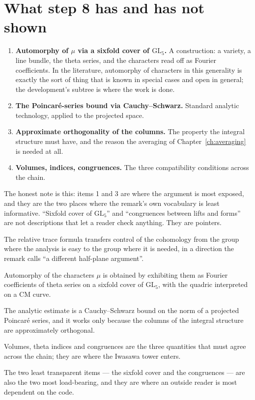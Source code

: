 \section{What step 8 has and has not shown}\begin{enumerate}
\item \textbf{Automorphy of $\mu$ via a sixfold cover of $\mathrm{GL}_5$.} A
construction: a variety, a line bundle, the theta series, and the characters
read off as Fourier coefficients. In the literature, automorphy of characters
in this generality is exactly the sort of thing that is known in special cases
and open in general; the development's  subtree is
where the work is done.
\item \textbf{The Poincar\'e-series bound via Cauchy--Schwarz.} Standard
analytic technology, applied to the projected space.
\item \textbf{Approximate orthogonality of the columns.} The property the
integral structure must have, and the reason the averaging of
Chapter~\ref{ch:averaging} is needed at all.
\item \textbf{Volumes, indices, congruences.} The three compatibility
conditions across the chain.
\end{enumerate}

The honest note is this: items 1 and 3 are where the argument is most exposed,
and they are the two places where the remark's own vocabulary is least
informative. ``Sixfold cover of $\mathrm{GL}_5$'' and ``congruences between
lifts and forms'' are not descriptions that let a reader check anything. They
are pointers.

\begin{keytakeaways}
\item The relative trace formula transfers control of the cohomology from the
group where the analysis is easy to the group where it is needed, in a
direction the remark calls ``a different half-plane argument''.
\item Automorphy of the characters $\mu$ is obtained by exhibiting them as
Fourier coefficients of theta series on a sixfold cover of $\mathrm{GL}_5$,
with the quadric interpreted on a CM curve.
\item The analytic estimate is a Cauchy--Schwarz bound on the norm of a
projected Poincar\'e series, and it works only because the columns of the
integral structure are approximately orthogonal.
\item Volumes, theta indices and congruences are the three quantities that must
agree across the chain; they are where the Iwasawa tower enters.
\item The two least transparent items --- the sixfold cover and the
congruences --- are also the two most load-bearing, and they are where an
outside reader is most dependent on the code.
\end{keytakeaways}
